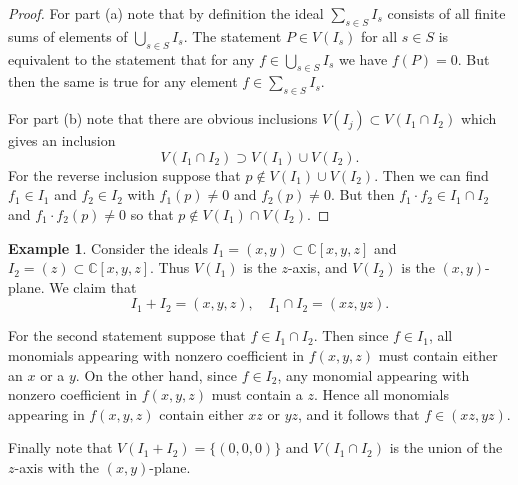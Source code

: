\documentclass [12pt,oneside,a4paper,mathscr]{amsart}
\theoremstyle{definition}
\newtheorem{example}[thm]{Example}
\newcommand {\C}{\mathbb C}
\begin{document}
\begin{proof}
For part (a) note that by definition  the ideal $\sum_{s\in S} I_s$ consists of all finite sums of elements of $\bigcup_{s\in S} I_s$. The statement $P\in V(I_s)$ for all $s\in S$ is equivalent to the statement that for any $f\in\bigcup_{s\in S}  I_s$ we have $f(P)=0$. But then the same is true for any element $f\in \sum_{s\in S} I_s$.   

For part (b) note that there are obvious inclusions $V(I_j)\subset V(I_1\cap I_2)$ which gives an inclusion 
\[V(I_1\cap I_2)\supset V(I_1)\cup V(I_2).\]
For the reverse inclusion suppose that 
$p\notin V(I_1)\cup V(I_2)$. Then we can find $f_1\in I_1$ and $f_2\in I_2$ with $f_1(p)\neq 0$ and $f_2(p)\neq 0$. But then $f_1\cdot f_2\in I_1\cap I_2$ and $f_1\cdot f_2(p)\neq 0$ so that $p\notin V(I_1)\cap V(I_2)$.
\end{proof}

\begin{example}
Consider the ideals $I_1=(x,y)\subset \C[x,y,z]$ and $I_2=(z)\subset \C[x,y,z]$. 
Thus  $V(I_1)$ is the $z$-axis, and $V(I_2)$ is the $(x,y)$-plane. We claim that
 \[ I_1+I_2=(x,y,z), \quad   I_1\cap I_2=(xz,yz).\]

For the second statement suppose that $f\in I_1\cap I_2$. Then since $f\in I_1$, all monomials appearing with nonzero coefficient in $f(x,y,z)$ must contain either an $x$ or a $y$. On the other hand, since $f\in I_2$, any monomial appearing with nonzero coefficient in $f(x,y,z)$ must contain a $z$. Hence all monomials appearing in $f(x,y,z)$ contain either $xz$ or $yz$, and it follows that $f\in (xz,yz)$.

Finally note that $V(I_1+I_2)=\{(0,0,0)\}$ and $V(I_1\cap I_2)$ is the union of the $z$-axis with the $(x,y)$-plane.
\end{example}
\end{document}
